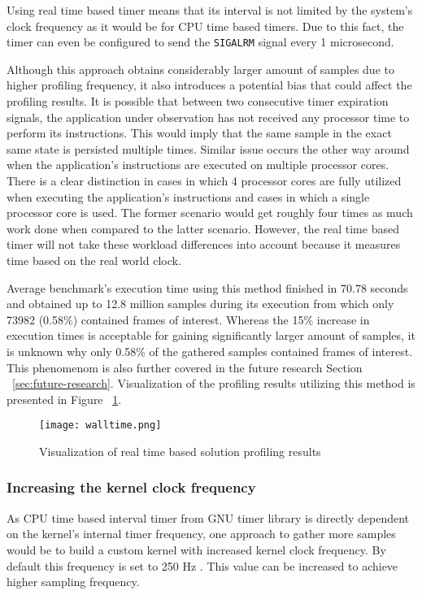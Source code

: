 \documentclass[..thesis.tex]{subfiles}
\begin{document}
Using real time based timer means that its interval is not limited by the system's clock frequency as it would be for CPU time based timers. Due to this fact, the timer can even be configured to send the \texttt{SIGALRM} signal every 1 microsecond.

Although this approach obtains considerably larger amount of samples due to higher profiling frequency, it also introduces a potential bias that could affect the profiling results. It is possible that between two consecutive timer expiration signals, the application under observation has not received any processor time to perform its instructions. This would imply that the same sample in the exact same state is persisted multiple times. Similar issue occurs the other way around when the application's instructions are executed on multiple processor cores. 
There is a clear distinction in cases in which 4 processor cores are fully utilized when executing the application's instructions and cases in which a single processor core is used. The former scenario would get roughly four times as much work done when compared to the latter scenario. However, the real time based timer will not take these workload differences into account because it measures time based on the real world clock.

Average benchmark's execution time using this method finished in 70.78 seconds and obtained up to 12.8 million samples during its execution from which only 73982 (0.58\%) contained frames of interest. Whereas the 15\% increase in execution times is acceptable for gaining significantly larger amount of samples, it is unknown why only 0.58\% of the gathered samples contained frames of interest. This phenomenom is also further covered in the future research Section ~\ref{sec:future-research}. Visualization of the profiling results utilizing this method is presented in Figure ~\ref{fig:walltime}.
\begin{figure}[H]
\texttt{[image: walltime.png]}
\caption{Visualization of real time based solution profiling results}
\label{fig:walltime}
\end{figure}

\subsubsection{Increasing the kernel clock frequency}
\label{kernel-clock}
As CPU time based interval timer from GNU timer library is directly dependent on the kernel's internal timer frequency, one approach to gather more samples would be to build a custom kernel with increased kernel clock frequency. By default this frequency is set to 250 Hz \cite{torvalds_linux:_2018}. This value can be increased to achieve higher sampling frequency. 
\end{document}
